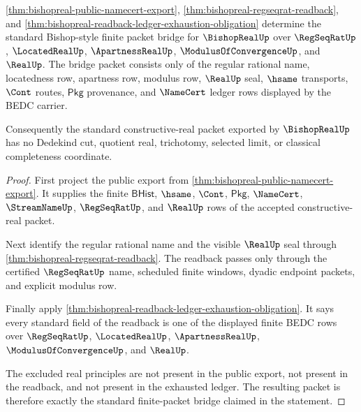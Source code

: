 \begin{theorem}
\label{thm:bishopreal-standard-finite-packet-bridge}
\autoref{thm:bishopreal-public-namecert-export},
\autoref{thm:bishopreal-regseqrat-readback}, and
\autoref{thm:bishopreal-readback-ledger-exhaustion-obligation} determine the
standard Bishop-style finite packet bridge for $\BishopRealUp$ over
$\RegSeqRatUp$, $\LocatedRealUp$, $\ApartnessRealUp$,
$\ModulusOfConvergenceUp$, and $\RealUp$. The bridge packet consists only of
the regular rational name, locatedness row, apartness row, modulus row,
$\RealUp$ seal, $\hsame$ transports, $\Cont$ routes, $\mathsf{Pkg}$ provenance,
and $\NameCert$ ledger rows displayed by the BEDC carrier.

Consequently the standard constructive-real packet exported by
$\BishopRealUp$ has no Dedekind cut, quotient real, trichotomy, selected limit,
or classical completeness coordinate.
\end{theorem}
\begin{proof}
First project the public export from
\autoref{thm:bishopreal-public-namecert-export}. It supplies the finite
$\mathsf{BHist}$, $\hsame$, $\Cont$, $\mathsf{Pkg}$, $\NameCert$,
$\StreamNameUp$, $\RegSeqRatUp$, and $\RealUp$ rows of the accepted
constructive-real packet.

Next identify the regular rational name and the visible $\RealUp$ seal through
\autoref{thm:bishopreal-regseqrat-readback}. The readback passes only through
the certified $\RegSeqRatUp$ name, scheduled finite windows, dyadic endpoint
packets, and explicit modulus row.

Finally apply \autoref{thm:bishopreal-readback-ledger-exhaustion-obligation}.
It says every standard field of the readback is one of the displayed finite
BEDC rows over $\RegSeqRatUp$, $\LocatedRealUp$, $\ApartnessRealUp$,
$\ModulusOfConvergenceUp$, and $\RealUp$.

The excluded real principles are not present in the public export, not present
in the readback, and not present in the exhausted ledger. The resulting packet
is therefore exactly the standard finite-packet bridge claimed in the
statement.
\end{proof}

